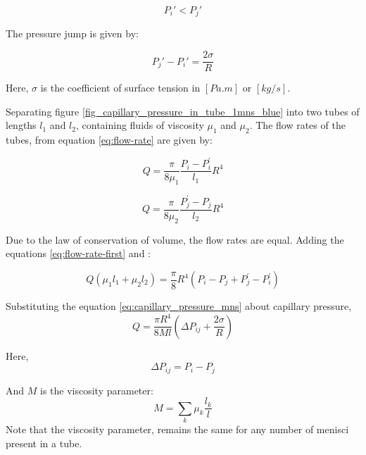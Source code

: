 	\begin{equation}
		P_{i}' < P_{j}'
	\end{equation}
	
	The pressure jump is given by:
	
	\begin{equation} \label{eq:capillary_pressure_mns}
		P_{j}' - P_{i}' = \frac{2 \sigma}{R}
	\end{equation}
	
	Here, $\sigma$ is the coefficient of surface tension in $[Pa.m]$ or $[kg/s]$.
	
	Separating figure \ref{fig_capillary_pressure_in_tube_1mns_blue} into two tubes of lengths $l_{1}$ and $l_{2}$, containing fluids of viscosity ${\mu}_1$ and ${\mu}_2$. The flow rates of the tubes, from equation \ref{eq:flow-rate} are given by:
	
	\begin{equation} \label{eq:flow-rate-first}
		Q = \frac{\pi}{8{\mu}_1} \frac{P_i - P^{'}_i}{l_1} R^4
	\end{equation}
	
	\begin{equation} \label{eq:flow-rate-second}
		Q = \frac{\pi}{8{\mu}_2} \frac{P^{'}_j - P_j}{l_2} R^4
	\end{equation}
	
	Due to the law of conservation of volume, the flow rates are equal. Adding the equations \ref{eq:flow-rate-first} and \label{eq:flow-rate-second}:
	
	\begin{equation} \label{eq:flow-rate-intermediate}
		Q({\mu}_1 l_1 + {\mu}_2 l_2) = \frac{\pi}{8}R^4(P_i - P_j + P^{'}_j - P^{'}_i)
	\end{equation}
	
	Substituting the equation \ref{eq:capillary_pressure_mns} about capillary pressure,
	\begin{equation} \label{eq:flow-rate-1mns-basic-m}
		Q = \frac{\pi R^4}{8Ml} \left( \Delta P_{ij} + \frac{2\sigma}{R} \right)
	\end{equation}
	
	Here,
	\begin{equation} \label{eq:def-pressure-difference} 
		\Delta P_{ij} = P_{i} - P_{j}
	\end{equation}
	
	And $M$ is the viscosity parameter:
	\begin{equation}
		M = \sum_{k} \mu_{k} \frac{l_{k}}{l}
	\end{equation}
	Note that the viscosity parameter, remains the same for any number of menisci present in a tube.
	

